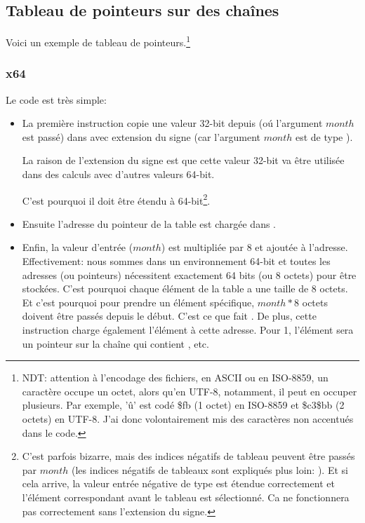 ﻿\subsection{Tableau de pointeurs sur des chaînes}
\label{array_of_pointers_to_strings}

Voici un exemple de tableau de pointeurs.\footnote{NDT: attention à l'encodage des
fichiers, en ASCII ou en ISO-8859, un caractère occupe un octet, alors qu'en UTF-8,
notamment, il peut en occuper plusieurs. Par exemple, 'û' est codé \$fb (1 octet)
en ISO-8859 et \$c3\$bb (2 octets) en UTF-8. J'ai donc volontairement mis des caractères
non accentués dans le code.}



\subsubsection{x64}



Le code est très simple:

\begin{itemize}

\item
{}

La première instruction  copie une valeur 32-bit depuis \ECX (oú l'argument
$month$ est passé) dans \RAX avec extension du signe (car l'argument $month$ est
de type \Tint).

La raison de l'extension du signe est que cette valeur 32-bit va être utilisée dans
des calculs avec d'autres valeurs 64-bit.

C'est pourquoi il doit être étendu à 64-bit\footnote{C'est parfois bizarre, mais des
indices négatifs de tableau peuvent être passés par $month$ (les indices négatifs
de tableaux sont expliqués plus loin: ).
Et si cela arrive, la valeur entrée négative de type \Tint est étendue correctement
et l'élément correspondant avant le tableau est sélectionné.
Ca ne fonctionnera pas correctement sans l'extension du signe.}.

\item
Ensuite l'adresse du pointeur de la table est chargée dans \RCX.

\item
Enfin, la valeur d'entrée ($month$) est multipliée par 8 et ajoutée à l'adresse.
Effectivement: nous sommes dans un environnement 64-bit et toutes les adresses (ou
pointeurs) nécessitent exactement 64 bits (ou 8 octets) pour être stockées.
C'est pourquoi chaque élément de la table a une taille de 8 octets.
Et c'est pourquoi pour prendre un élément spécifique, $month*8$ octets doivent être
passés depuis le début.
C'est ce que fait \MOV.
De plus, cette instruction charge également l'élément à cette adresse.
Pour 1, l'élément sera un pointeur sur la chaîne qui contient , etc.

\end{itemize}


